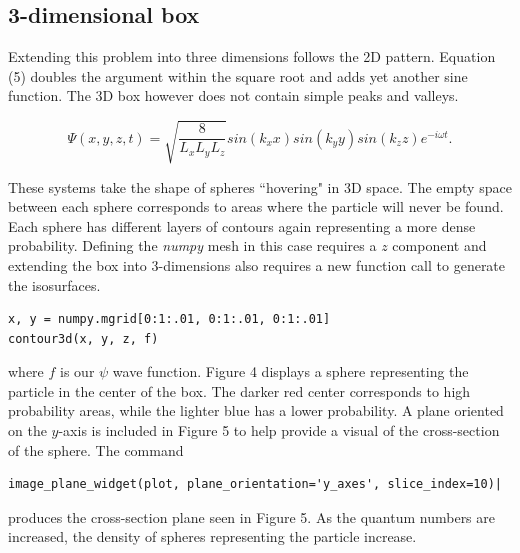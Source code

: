 \documentclass[11pt]{article}
\begin{document}
\subsection{3-dimensional box}
Extending this problem into three dimensions follows the 2D pattern. Equation (5) doubles the argument within the square root and adds yet another sine function. The 3D box however does not contain simple peaks and valleys. 

\begin{equation}
\Psi(x, y, z, t) = \sqrt{\frac{8}{L_x L_y L_z}}sin(k_x x)sin(k_y y)sin(k_z z)e^{-i\omega t}.
\end{equation}

These systems take the shape of spheres ``hovering" in 3D space. The empty space between each sphere corresponds to areas where the particle will never be found. Each sphere has different layers of contours again representing a more dense probability. Defining the \textit{numpy} mesh in this case requires a $z$ component and extending the box into 3-dimensions also requires a new function call to generate the isosurfaces. 

\begin{verbatim}
x, y = numpy.mgrid[0:1:.01, 0:1:.01, 0:1:.01]
contour3d(x, y, z, f)
\end{verbatim}



\noindent where $f$ is our $\psi$ wave function. Figure 4 displays a sphere representing the particle in the center of the box. The darker red center corresponds to high probability areas, while the lighter blue has a lower probability. A plane oriented on the $y$-axis is included in Figure 5 to help provide a visual of the cross-section of the sphere. The command 
\begin{verbatim}
image_plane_widget(plot, plane_orientation='y_axes', slice_index=10)|
\end{verbatim}


\noindent produces the cross-section plane seen in Figure 5. As the quantum numbers are increased, the density of spheres representing the particle increase. 
\end{document}
